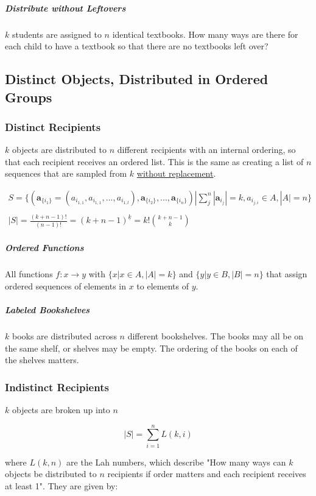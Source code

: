 \subparagraph{Distribute without Leftovers} $k$ students are assigned to $n$ identical textbooks. How many ways are there for each child to have a textbook so that there are no textbooks left over? 


\subsection{Distinct Objects, Distributed in Ordered Groups}

\subsubsection{Distinct Recipients}
$k$ objects are distributed to $n$ different recipients with an internal ordering, so that each recipient receives an ordered list. This is the same as creating a list of $n$ sequences that are sampled from $k$ \underline{without replacement}. 

\begin{equation}
\begin{array}{l}
S = \{ (\mathbf{a}_{\{i_1\}}  = ( a_{i_{1,1}},a_{i_{1,1}},...,a_{i_{1,l}} ),\mathbf{a}_{\{i_2\}},...,\mathbf{a}_{\{i_n\}}) | \sum^n_j |\mathbf{a}_{i_j}| = k, a_{i_{j,i}} \in A, |A| = n \} \\
\\
|S| = \frac{(k + n - 1)!}{(n-1)!} = ( k+n-1)^{\underline{k}} = k! {k+n-1 \choose k}
\end{array}
\end{equation}


\subparagraph{Ordered Functions}  All functions $f: x \rightarrow y$ with $\{x | x\in A, |A| = k \}$ and $\{y | y\in B, |B| = n\}$ that assign ordered sequences of elements in $x$ to elements of $y$.

\subparagraph{Labeled Bookshelves} $k$ books are distributed across $n$ different bookshelves. The books may all be on the same shelf, or shelves may be empty. The ordering of the books on each of the shelves matters.


\subsubsection{Indistinct Recipients}
$k$ objects are broken up into $n$ 

\begin{equation}
|S| = \sum_{i=1}^n L(k,i) 
\end{equation}

where $L(k,n)$ are the Lah numbers, which describe "How many ways can $k$ objects be distributed to $n$ recipients if order matters and each recipient receives at least 1". They are given by:

